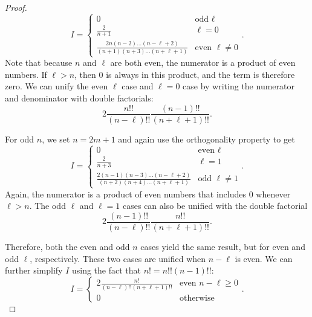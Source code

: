 \documentclass[../../main.tex]{subfiles}
\begin{document}
\begin{refsection}
\begin{proof}
\begin{equation*}
			I = \begin{cases}
				0                                                                             & \text{odd } \ell        \\
				\frac{2}{n + 1}                                                               & \ell = 0                \\
				\frac{2 n (n - 2) \ldots(n - \ell + 2)}{(n + 1)(n + 3) \ldots (n + \ell + 1)} & \text{even } \ell \ne 0
			\end{cases}.
		\end{equation*}
		Note that because $n$ and $\ell$ are both even, the numerator is a product of even numbers.
		If $\ell > n$, then 0 is always in this product, and the term is therefore zero.
		We can unify the even $\ell$ case and $\ell=0$ case by writing the numerator and denominator with double factorials:
		$$2 \frac{n!!}{(n-\ell)!!} \frac{(n - 1)!!}{(n + \ell + 1)!!}.$$

		For odd $n$, we set $n = 2m+1$ and again use the orthogonality property to get
		\begin{equation*}
			I = \begin{cases}
				0                                                                                  & \text{even } \ell      \\
				\frac{2}{n + 3}                                                                    & \ell = 1               \\
				\frac{2(n - 1) (n - 3) \ldots(n - \ell + 2)}{(n + 2)(n + 4) \ldots (n + \ell + 1)} & \text{odd } \ell \ne 1
			\end{cases}.
		\end{equation*}
		Again, the numerator is a product of even numbers that includes 0 whenever $\ell > n$.
		The odd $\ell$ and $\ell = 1$ cases can also be unified with the double factorial
		$$2\frac{(n - 1)!!}{(n - \ell)!!} \frac{n!!}{(n + \ell + 1)!!}.$$

		Therefore, both the even and odd $n$ cases yield the same result, but for even and odd $\ell$, respectively.
		These two cases are unified when $n - \ell$ is even.
		We can further simplify $I$ using the fact that $n! = n!! (n - 1)!!$:
		\begin{equation*}
			I = \begin{cases}
				2 \frac{n!}{(n - \ell)!! (n + \ell + 1)!!} & \text{even } n - \ell \ge 0 \\
				0                                          & \text{otherwise }
			\end{cases}.
		\end{equation*}
	\end{proof}


\end{refsection}
\end{document}
